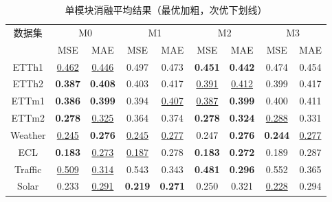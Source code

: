 \begin{table}[htbp]
    \centering
    \caption{单模块消融平均结果（最优加粗，次优下划线）}
    \label{tab:single_module_avg}
    \begin{tabular*}{\textwidth}{@{\extracolsep{\fill}}c*{8}{c}@{}}
        \toprule
        数据集 & \multicolumn{2}{c}{M0} & \multicolumn{2}{c}{M1} & \multicolumn{2}{c}{M2} & \multicolumn{2}{c}{M3} \\
        & MSE & MAE & MSE & MAE & MSE & MAE & MSE & MAE \\
        \midrule
        ETTh1 & \underline{0.462} & \underline{0.446} & 0.497 & 0.473 & \textbf{0.451} & \textbf{0.442} & 0.474 & 0.454 \\
        ETTh2 & \textbf{0.387} & \textbf{0.408} & 0.403 & 0.417 & \underline{0.391} & \underline{0.412} & 0.399 & 0.417 \\
        ETTm1 & \textbf{0.386} & \textbf{0.399} & 0.394 & \underline{0.407} & \underline{0.387} & \textbf{0.399} & 0.400 & 0.411 \\
        ETTm2 & \textbf{0.278} & \underline{0.325} & 0.364 & 0.374 & \textbf{0.278} & \textbf{0.324} & \underline{0.288} & 0.331 \\
        Weather & \underline{0.245} & \textbf{0.276} & \underline{0.245} & \underline{0.277} & 0.247 & \textbf{0.276} & \textbf{0.244} & \underline{0.277} \\
        ECL & \textbf{0.183} & \underline{0.273} & \underline{0.187} & 0.278 & \textbf{0.183} & \textbf{0.272} & 0.189 & 0.287 \\
        Traffic & \underline{0.509} & \underline{0.314} & 0.543 & 0.343 & \textbf{0.481} & \textbf{0.296} & 0.552 & 0.365 \\
        Solar & 0.233 & \underline{0.291} & \textbf{0.219} & \textbf{0.271} & 0.250 & 0.321 & \underline{0.228} & 0.294 \\
        \bottomrule
    \end{tabular*}
\end{table}
